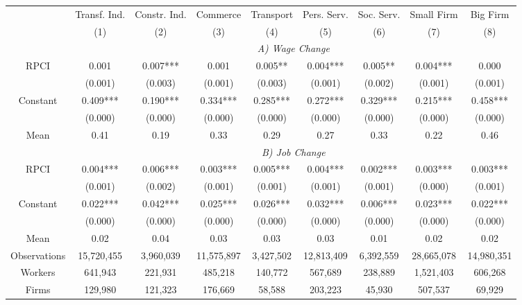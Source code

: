 \begin{tabular}{ccccccccc}
\toprule
\toprule
      & Transf. Ind. & Constr. Ind. & Commerce & Transport & Pers. Serv. & Soc. Serv. & Small Firm & Big Firm \\
      & (1)   & (2)   & (3)   & (4)   & (5)   & (6)   & (7)   & (8) \\
\cmidrule{2-9}      & \multicolumn{8}{c}{\textit{A) Wage Change}} \\
\midrule
RPCI  & 0.001 & 0.007*** & 0.001 & 0.005** & 0.004*** & 0.005** & 0.004*** & 0.000 \\
      & (0.001) & (0.003) & (0.001) & (0.003) & (0.001) & (0.002) & (0.001) & (0.001) \\
Constant & 0.409*** & 0.190*** & 0.334*** & 0.285*** & 0.272*** & 0.329*** & 0.215*** & 0.458*** \\
      & (0.000) & (0.000) & (0.000) & (0.000) & (0.000) & (0.000) & (0.000) & (0.000) \\
Mean  & 0.41  & 0.19  & 0.33  & 0.29  & 0.27  & 0.33  & 0.22  & 0.46 \\
\cmidrule{2-9}      & \multicolumn{8}{c}{\textit{B) Job Change}} \\
\midrule
RPCI  & 0.004*** & 0.006*** & 0.003*** & 0.005*** & 0.004*** & 0.002*** & 0.003*** & 0.003*** \\
      & (0.001) & (0.002) & (0.001) & (0.001) & (0.001) & (0.001) & (0.000) & (0.001) \\
Constant & 0.022*** & 0.042*** & 0.025*** & 0.026*** & 0.032*** & 0.006*** & 0.023*** & 0.022*** \\
      & (0.000) & (0.000) & (0.000) & (0.000) & (0.000) & (0.000) & (0.000) & (0.000) \\
Mean  & 0.02  & 0.04  & 0.03  & 0.03  & 0.03  & 0.01  & 0.02  & 0.02 \\
\midrule
Observations & 15,720,455 & 3,960,039 & 11,575,897 & 3,427,502 & 12,813,409 & 6,392,559 & 28,665,078 & 14,980,351 \\
Workers & 641,943 & 221,931 & 485,218 & 140,772 & 567,689 & 238,889 & 1,521,403 & 606,268 \\
Firms & 129,980 & 121,323 & 176,669 & 58,588 & 203,223 & 45,930 & 507,537 & 69,929 \\
\bottomrule
\bottomrule
\end{tabular}%
